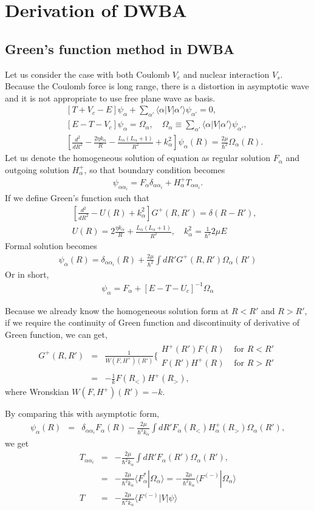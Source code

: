 \documentclass[10pt]{book}
\newcommand{\bea}{\begin{eqnarray}}
\newcommand{\eea}{\end{eqnarray}}
\newcommand{\no}{\nonumber \\}
\def\la{\langle}
\def\ra{\rangle}
\begin{document}
\section{Derivation of DWBA}
\subsection{Green's function method in DWBA}
Let us consider the case with both Coulomb $V_c$ and nuclear interaction $V_s$.
Because the Coulomb force is long range, there is a distortion in asymptotic wave
and it is not appropriate to use free plane wave as basis. 
\bea 
& &[T+V_c-E]\psi_\alpha+\sum_{\alpha'}\la \alpha|V|\alpha'\ra \psi_{\alpha'}=0,\no 
& &[E-T-V_c]\psi_\alpha=\Omega_\alpha,
 \quad \Omega_\alpha\equiv \sum_{\alpha'}\la \alpha|V|\alpha'\ra \psi_{\alpha'},\no 
& &[\frac{d^2}{dR^2}-\frac{2\eta k_\alpha}{R}-\frac{L_\alpha(L_\alpha+1)}{R^2}
 +k_\alpha^2]\psi_\alpha(R)=\frac{2\mu}{\hbar^2}\Omega_\alpha(R). 
\eea
Let us denote the homogeneous solution of equation as 
regular solution $F_\alpha$ and outgoing solution $H^{+}_\alpha$, 
so that boundary condition becomes
\bea 
\psi_{\alpha\alpha_i}=F_\alpha \delta_{\alpha\alpha_i}+H^{+}_\alpha T_{\alpha\alpha_i}.
\eea 
If we define Green's function such that
\bea 
& &[\frac{d^2}{dR^2}-U(R)+k_\alpha^2]G^+(R,R')=\delta(R-R'),\no 
& & U(R)=2\frac{\eta k_\alpha}{R}+\frac{L_\alpha(L_\alpha+1)}{R^2}, \quad 
k_\alpha^2=\frac{1}{\hbar^2}2\mu E
\eea 
Formal solution becomes
\bea 
\psi_\alpha(R)=\delta_{\alpha\alpha_i}(R)+
            \frac{2\mu}{\hbar^2}\int dR' G^+(R,R')\Omega_\alpha(R')
\eea 
Or in short,
\bea 
\psi_\alpha=F_\alpha+[E-T-U_c]^{-1}\Omega_\alpha 
\eea 

Because we already know the homogeneous solution form at $R<R'$ and $R>R'$,
if we require the continuity of Green function
and discontinuity of derivative of Green function,
we can get,
\bea 
G^+(R,R')&=&\frac{1}{W(F,H^+)(R')}\Big\{ \begin{array}{ll} H^+(R')F(R) & \mbox{ for } R<R' \\
                                                         F(R')H^+(R) & \mbox{ for } R>R'
             \end{array} \no 
         &=&-\frac{1}{k}F(R_{<})H^+(R_{>}),    
\eea 
where Wronskian $W(F,H^+)(R')=-k$.

By comparing this with asymptotic form, 
\bea 
\psi_\alpha(R)&=&\delta_{\alpha\alpha_i}F_\alpha(R)
              -\frac{2\mu}{\hbar^2 k_\alpha}\int d R'
              F_{\alpha}(R_<) H^+_\alpha(R_>)\Omega_\alpha(R'),
\eea 
we get
\bea 
T_{\alpha\alpha_i}&=&-\frac{2\mu}{\hbar^2 k_\alpha}\int d R' F_\alpha(R')\Omega_\alpha(R'),\no 
                  &=&-\frac{2\mu}{\hbar^2 k_\alpha}\la F^*_\alpha|\Omega_\alpha\ra 
                  =-\frac{2\mu}{\hbar^2 k_\alpha}\la F^{(-)}|\Omega_\alpha\ra\no 
 T&=&-\frac{2\mu}{\hbar^2 k_\alpha}\la F^{(-)}|V|\psi\ra  
\eea 
\end{document}
